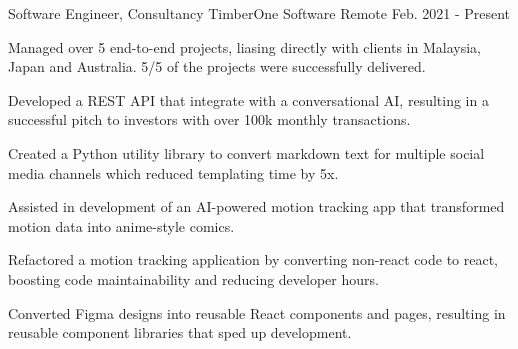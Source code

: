

\begin{cventries}

  \cventry
    {Software Engineer, Consultancy} %
    {TimberOne Software} %
    {Remote} %
    {Feb. 2021 - Present} %
    {
      \begin{cvitems} %
        \item {Managed over 5 end-to-end projects, liasing directly with clients in Malaysia, Japan and Australia. 5/5 of the projects were successfully delivered.}
        \item {Developed a REST API that integrate with a conversational AI, resulting in a successful pitch to investors with over 100k monthly transactions.}
        \item {Created a Python utility library to convert markdown text for multiple social media channels which reduced templating time by 5x.}
        \item {Assisted in development of an AI-powered motion tracking app that transformed motion data into anime-style comics.}
        \item {Refactored a motion tracking application by converting non-react code to react, boosting code maintainability and reducing developer hours.}
        \item {Converted Figma designs into reusable React components and pages, resulting in reusable component libraries that sped up development.}
      \end{cvitems}
    }


\end{cventries}
